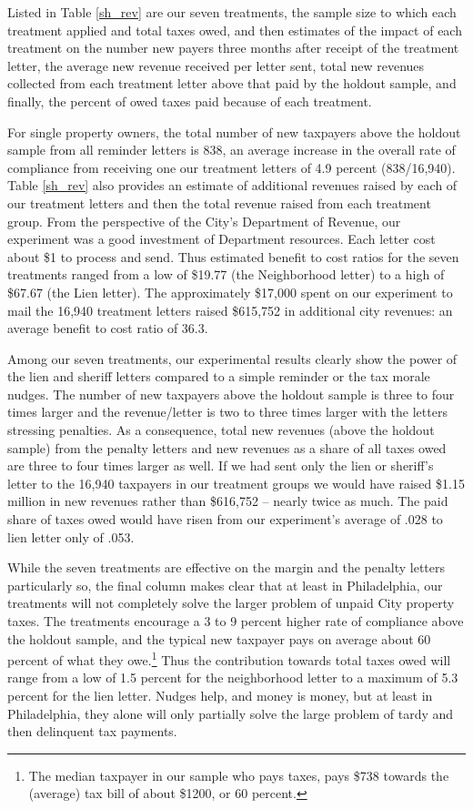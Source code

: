 \documentclass[12pt]{article}
\begin{document}
Listed in Table \ref{sh_rev} are our seven treatments, the sample size
to which each treatment applied and total taxes owed, and then
estimates of the impact of each treatment on the number new payers
three months after receipt of the treatment letter, the average new
revenue received per letter sent, total new revenues collected from
each treatment letter above that paid by the holdout sample, and
finally, the percent of owed taxes paid because of each treatment.

For single property owners, the total number of new taxpayers above
the holdout sample from all reminder letters is 838, an average
increase in the overall rate of compliance from receiving one our
treatment letters of 4.9 percent (838/16,940).  Table \ref{sh_rev}
also provides an estimate of additional revenues raised by each of our
treatment letters and then the total revenue raised from each
treatment group.  From the perspective of the City's Department of
Revenue, our experiment was a good investment of Department resources.
Each letter cost about \$1 to process and send.  Thus estimated
benefit to cost ratios for the seven treatments ranged from a low of
\$19.77 (the Neighborhood letter) to a high of \$67.67 (the Lien
letter).  The approximately \$17,000 spent on our experiment to mail
the 16,940 treatment letters raised \$615,752 in additional city
revenues: an average benefit to cost ratio of 36.3.

Among our seven treatments, our experimental results clearly show the
power of the lien and sheriff letters compared to a simple reminder or
the tax morale nudges.  The number of new taxpayers above the holdout
sample is three to four times larger and the revenue/letter is two to
three times larger with the letters stressing penalties.  As a
consequence, total new revenues (above the holdout sample) from the
penalty letters and new revenues as a share of all taxes owed are
three to four times larger as well.  If we had sent only the lien or
sheriff's letter to the 16,940 taxpayers in our treatment groups we
would have raised \$1.15 million in new revenues rather than \$616,752
-- nearly twice as much.  The paid share of taxes owed would have
risen from our experiment's average of .028 to lien letter only of
.053.

While the seven treatments are effective on the margin and the penalty
letters particularly so, the final column makes clear that at least in
Philadelphia, our treatments will not completely solve the larger
problem of unpaid City property taxes.  The treatments encourage a 3
to 9 percent higher rate of compliance above the holdout sample, and
the typical new taxpayer pays on average about 60 percent of what they
owe.\footnote{The median taxpayer in our sample who pays taxes, pays
  \$738 towards the (average) tax bill of about \$1200, or 60
  percent.}  Thus the contribution towards total taxes owed will range
from a low of 1.5 percent for the neighborhood letter to a maximum of
5.3 percent for the lien letter.  Nudges help, and money is money, but
at least in Philadelphia, they alone will only partially solve the
large problem of tardy and then delinquent tax payments.
\end{document}
